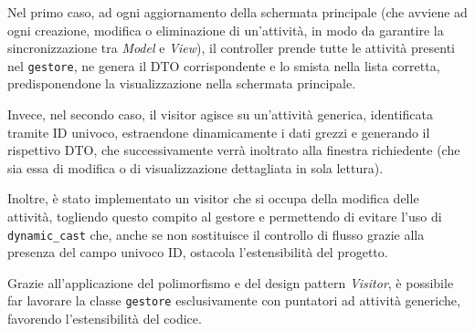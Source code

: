 Nel primo caso, ad ogni aggiornamento della schermata principale (che avviene ad ogni creazione, modifica
o eliminazione di un'attività, in modo da garantire la sincronizzazione tra \textit{Model} e
\textit{View}), il controller prende tutte le attività presenti nel \texttt{gestore}, ne genera il
DTO corrispondente e lo smista nella lista corretta, predisponendone la visualizzazione nella
schermata principale.

Invece, nel secondo caso, il visitor agisce su un'attività generica, identificata tramite ID
univoco, estraendone dinamicamente i dati grezzi e generando il rispettivo DTO, che successivamente
verrà inoltrato alla finestra richiedente (che sia essa di modifica o di visualizzazione dettagliata
in sola lettura).

Inoltre, è stato implementato un visitor che si occupa della modifica delle attività, togliendo questo
compito al gestore e permettendo di evitare l'uso di \texttt{dynamic\_cast} che, anche se non sostituisce
il controllo di flusso grazie alla presenza del campo univoco ID, ostacola l'estensibilità del progetto.

Grazie all'applicazione del polimorfismo e del design pattern \textit{Visitor}, è possibile far
lavorare la classe \texttt{gestore} esclusivamente con puntatori ad attività generiche,
favorendo l'estensibilità del codice.